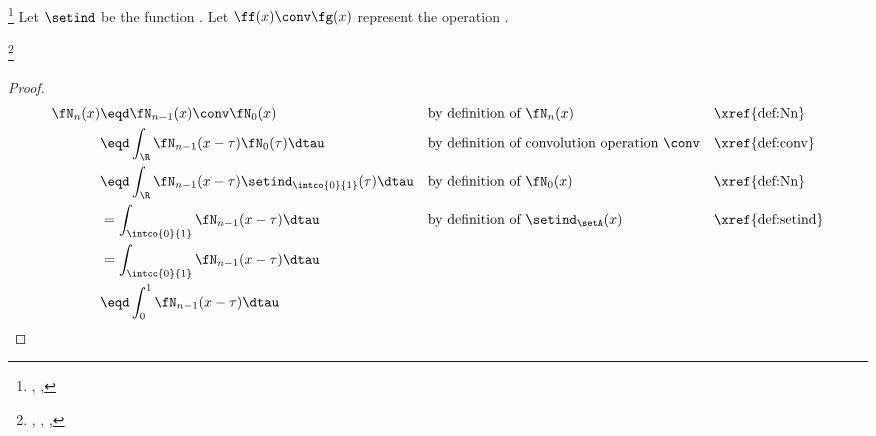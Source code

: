 \begin{definition}
\footnote{
  ,
  ,
  }
\label{def:Nn}
\label{def:Bspline}
Let $\setind$ be the  function .
Let $\ff(x)\conv\fg(x)$ represent the  operation . %
\end{definition}

\begin{lemma}
\footnote{
  ,
  ,
  ,
  }
\label{lem:Nn}
\end{lemma}
\begin{proof}
  \begin{align*}
    \fN_{n}(x)
      &\eqd \fN_{n-1}(x)\conv\fN_0(x)
      && \text{by definition of $\fN_n(x)$} 
      && \text{\xref{def:Nn}}
    \\&\eqd \int_\R\fN_{n-1}(x-\tau)\fN_0(\tau)\dtau
      && \text{by definition of convolution operation $\conv$} 
      && \text{\xref{def:conv}}
    \\&\eqd \int_\R\fN_{n-1}(x-\tau)\setind_\intco{0}{1}(\tau)  \dtau
      && \text{by definition of $\fN_0(x)$} 
      && \text{\xref{def:Nn}}
    \\&= \int_\intco{0}{1} \fN_{n-1}(x-\tau)\dtau
      && \text{by definition of $\setind_\setA(x)$} 
      && \text{\xref{def:setind}}
    \\&= \int_\intcc{0}{1} \fN_{n-1}(x-\tau)\dtau
    \\&\eqd \int_0^1 \fN_{n-1}(x-\tau)\dtau
  \end{align*}
\end{proof}



